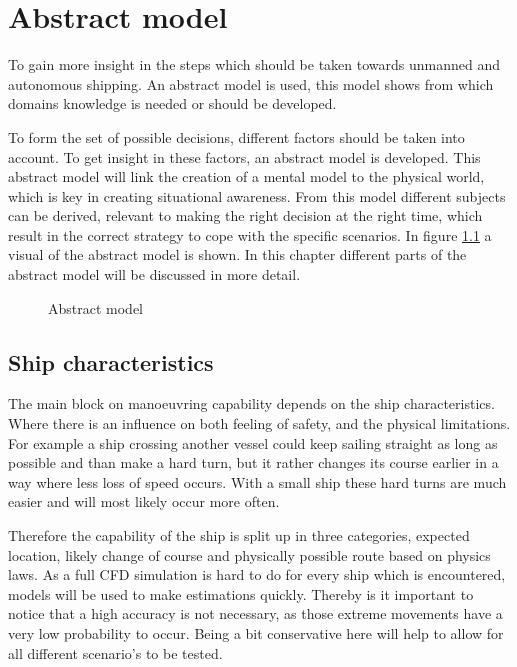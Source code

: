 \chapter{Abstract model}
To gain more insight in the steps which should be taken towards unmanned and autonomous shipping. An abstract model is used, this model shows from which domains knowledge is needed or should be developed. 

To form the set of possible decisions, different factors should be taken into account. To get insight in these factors, an abstract model is developed. This abstract model will link the creation of a mental model to the physical world, which is key in creating situational awareness. From this model different subjects can be derived, relevant to making the right decision at the right time, which result in the correct strategy to cope with the specific scenarios.
In figure \ref{fig:abstract-model} a visual of the abstract model is shown. In this chapter different parts of the abstract model will be discussed in more detail.

\begin{figure}[hb]
	\centering
	\caption{Abstract model}
	\label{fig:abstract-model}
\end{figure}

\section{Ship characteristics}
The main block on manoeuvring capability depends on the ship characteristics. Where there is an influence on both feeling of safety, and the physical limitations. For example a ship crossing another vessel could keep sailing straight as long as possible and than make a hard turn, but it rather changes its course earlier in a way where less loss of speed occurs. With a small ship these hard turns are much easier and will most likely occur more often.

Therefore the capability of the ship is split up in three categories, expected location, likely change of course and physically possible route based on physics laws.
As a full CFD simulation is hard to do for every ship which is encountered, models will be used to make estimations quickly. Thereby is it important to notice that a high accuracy is not necessary, as those extreme movements have a very low probability to occur. Being a bit conservative here will help to allow for all different scenario's to be tested.

